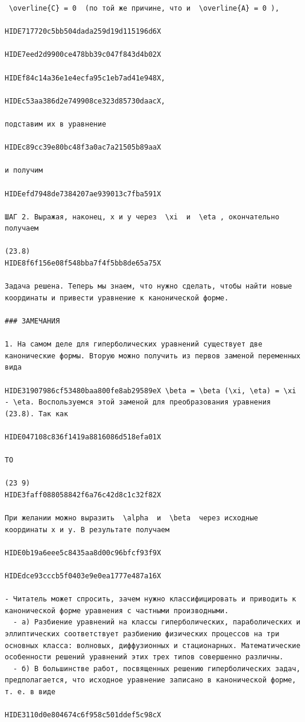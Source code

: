 \documentclass[
  ukrainian,
]{article}
\begin{document}
\begin{verbatim}
 \overline{C} = 0  (по той же причине, что и  \overline{A} = 0 ),

HIDE717720c5bb504dada259d19d115196d6X

HIDE7eed2d9900ce478bb39c047f843d4b02X

HIDEf84c14a36e1e4ecfa95c1eb7ad41e948X,

HIDEc53aa386d2e749908ce323d85730daacX,

подставим их в уравнение

HIDEc89cc39e80bc48f3a0ac7a21505b89aaX

и получим

HIDEefd7948de7384207ae939013c7fba591X

ШАГ 2. Выражая, наконец, x и y через  \xi  и  \eta , окончательно получаем

(23.8) 
HIDE8f6f156e08f548bba7f4f5bb8de65a75X

Задача решена. Теперь мы знаем, что нужно сделать, чтобы найти новые координаты и привести уравнение к канонической форме.

### ЗАМЕЧАНИЯ

1. На самом деле для гиперболических уравнений существует две канонические формы. Вторую можно получить из первов заменой переменных вида

HIDE31907986cf53480baa800fe8ab29589eX \beta = \beta (\xi, \eta) = \xi - \eta. Воспользуемся этой заменой для преобразования уравнения (23.8). Так как

HIDE047108c836f1419a8816086d518efa01X

TO

(23 9) 
HIDE3faff088058842f6a76c42d8c1c32f82X

При желании можно выразить  \alpha  и  \beta  через исходные координаты x и y. В результате получаем

HIDE0b19a6eee5c8435aa8d00c96bfcf93f9X

HIDEdce93cccb5f0403e9e0ea1777e487a16X

- Читатель может спросить, зачем нужно классифицировать и приводить к канонической форме уравнения с частными производными.
  - а) Разбиение уравнений на классы гиперболических, параболических и эллиптических соответствует разбиению физических процессов на три основных класса: волновых, диффузионных и стационарных. Математические особенности решений уравнений этих трех типов совершенно различны.
  - б) В большинстве работ, посвященных решению гиперболических задач, предполагается, что исходное уравнение записано в канонической форме, т. е. в виде

HIDE3110d0e804674c6f958c501ddef5c98cX


\end{verbatim}
\end{document}
